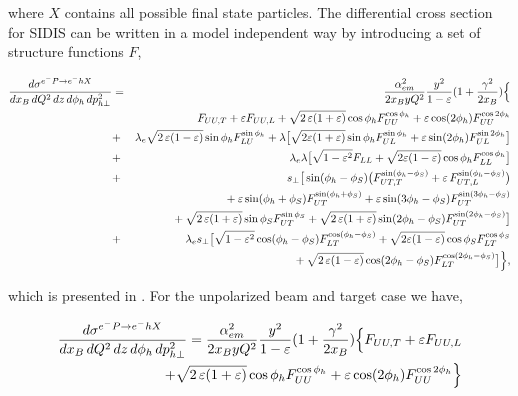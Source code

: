 where $X$ contains all possible final state particles.  The differential cross section for SIDIS can be written in a model independent way by introducing a set of structure functions $F$,

\begin{eqnarray}
\frac{d\sigma^{e^-P\to e^-hX}}{dx_B \, dQ^{2} \,dz\, d\phi_h\, d p_{h\perp}^2}
&=&\frac{\alpha^2_{em}}{2x_B y Q^2}
\frac{y^2}{1-\varepsilon}  ( 1+\frac{\gamma^2}{2x_B} ) \Bigl\{  \nonumber \\
&& F_{UU ,T} +  \varepsilon F_{UU ,L}
+ \sqrt{2\,\varepsilon (1+\varepsilon)} \cos\phi_h F_{UU}^{\cos\phi_h}
+ \varepsilon \cos(2\phi_h) F_{UU}^{\cos 2\phi_h} \nonumber \\
&+& \lambda_e
\sqrt{2\,\varepsilon (1-\varepsilon)} \sin\phi_h F_{LU}^{\sin\phi_h}
+ \lambda \big[ \sqrt{2 \varepsilon (1+\varepsilon)} \sin\phi_h F_{UL}^{\sin\phi_h}
  +  \varepsilon \sin(2\phi_h) F_{UL}^{\sin 2\phi_h} \big] \nonumber \\
&+&  \lambda_e \lambda
\big[\sqrt{1-\varepsilon^2} F_{LL}
  +\sqrt{2\varepsilon (1-\varepsilon)} \cos\phi_h F_{LL}^{\cos \phi_h}\big] \nonumber \\
&+& s_\perp
\big[ \sin(\phi_h-\phi_S) \bigl(F_{UT ,T}^{\sin(\phi_h -\phi_S)}
  + \varepsilon\, F_{UT ,L}^{\sin(\phi_h -\phi_S)}\bigr) \nonumber \\
  && \phantom{s_\perp}
  + \varepsilon \sin(\phi_h+\phi_S) F_{UT}^{\sin(\phi_h +\phi_S)}
  + \varepsilon \sin(3\phi_h-\phi_S) F_{UT}^{\sin(3\phi_h -\phi_S)} \nonumber \\
  && \phantom{s_\perp}
  + \sqrt{2\,\varepsilon (1+\varepsilon)} \sin\phi_S F_{UT}^{\sin \phi_S }
  + \sqrt{2\,\varepsilon (1+\varepsilon)} \sin(2\phi_h-\phi_S) F_{UT}^{\sin(2\phi_h -\phi_S)}\big]\nonumber \\
&+& \lambda_e s_\perp
\big[\sqrt{1-\varepsilon^2} \cos(\phi_h-\phi_S) F_{LT}^{\cos(\phi_h -\phi_S)}
  +\sqrt{2\varepsilon (1-\varepsilon)} \cos\phi_S F_{LT}^{\cos \phi_S} \nonumber \\
  && \phantom{\lambda_e s_\perp}
  +\sqrt{2\,\varepsilon (1-\varepsilon)} \cos(2\phi_h-\phi_S) F_{LT}^{\cos(2\phi_h - \phi_S)} \big] \Bigr\},
\label{e:crossmaster}
\end{eqnarray}

which is presented in \cite{bacchetta, mulders}. For the unpolarized beam and target case we have,

\begin{eqnarray}
  \frac{d\sigma^{e^-P\to e^-hX}}{dx_B \, dQ^{2}\, dz\, d\phi_h\, d p_{h\perp}^2} = \frac{\alpha^2_{em}}{2x_B y Q^2} \frac{y^2}{1-\varepsilon}  ( 1+\frac{\gamma^2}{2x_B} ) \Bigl\{ F_{UU ,T} +  \varepsilon F_{UU ,L} \nonumber \\
  + \sqrt{2\,\varepsilon (1+\varepsilon)} \cos\phi_h F_{UU}^{\cos\phi_h}+ \varepsilon \cos(2\phi_h) F_{UU}^{\cos 2\phi_h} \Bigr\}
\end{eqnarray}

